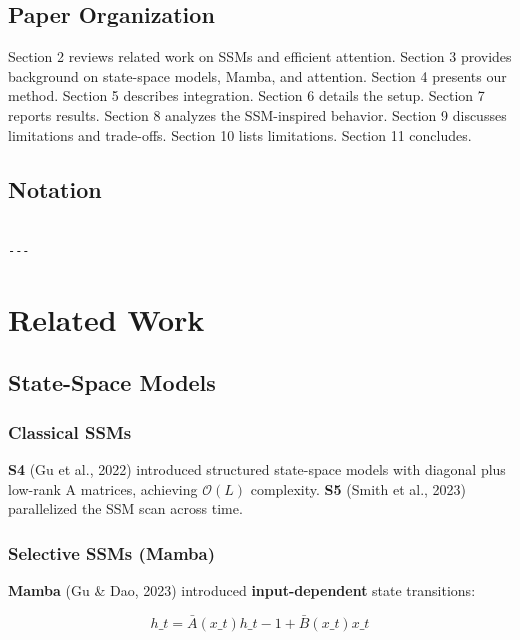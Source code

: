 \subsection{Paper Organization}

Section 2 reviews related work on SSMs and efficient attention. Section 3 
provides background on state-space models, Mamba, and attention. Section 4 
presents our method. Section 5 describes integration. Section 6 details the 
setup. Section 7 reports results. Section 8 analyzes the SSM-inspired 
behavior. Section 9 discusses limitations and trade-offs. Section 10 lists 
limitations. Section 11 concludes.



\subsection{Notation}

\begin{lstlisting}

---
\end{lstlisting}

\section{Related Work}

\subsection{State-Space Models}

\subsubsection{Classical SSMs}

\textbf{S4} (Gu et al., 2022) introduced structured state-space models with 
diagonal plus low-rank A matrices, achieving $\mathcal{O}(L)$ complexity. 
\textbf{S5} (Smith et al., 2023) parallelized the SSM scan across time.

\subsubsection{Selective SSMs (Mamba)}

\textbf{Mamba} (Gu \& Dao, 2023) introduced \textbf{input-dependent} state transitions:

\[
h\_t = \bar{A}(x\_t) h\_{t-1} + \bar{B}(x\_t) x\_t
\tag{2.1}
\]

